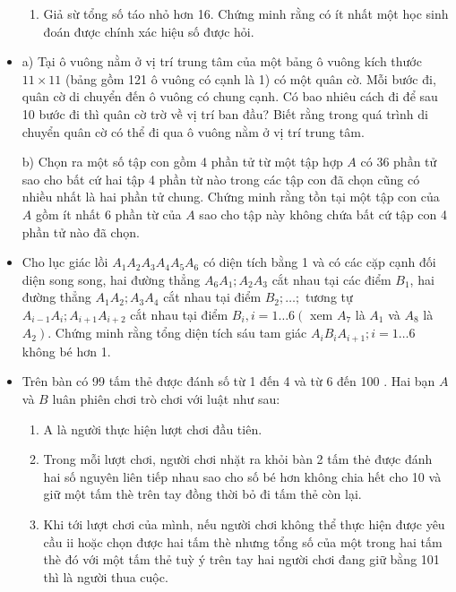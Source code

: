 \documentclass[11pt]{scrartcl}
\begin{document}
\begin{itemize}[label=, leftmargin=0em, itemsep=0.5em]
\begin{btvn}
\begin{enumerate}[label=(\alph*)]
            \item Giả sừ tổng số táo nhỏ hơn 16. Chứng minh rằng có ít nhất một học sinh đoán được chính xác hiệu số được hỏi.
        \end{enumerate}
    \end{btvn}
    \item \begin{btvn} a) Tại ô vuông nằm ở vị trí trung tâm của một bảng ô vuông kích thước $11 \times 11$ (bảng gồm 121 ô vuông có cạnh là 1) có một quân cờ. Mỗi bước đi, quân cờ di chuyển đến ô vuông có chung cạnh. Có bao nhiêu cách đi để sau 10 bước đi thì quân cờ trờ về vị trí ban đầu? Biết rằng trong quá trình di chuyển quân cờ có thể đi qua ô vuông nằm ở vị trí trung tâm.
    

        b) Chọn ra một số tập con gồm 4 phần tử từ một tập hợp $A$ có 36 phần tử sao cho bất cứ hai tập 4 phần từ nào trong các tập con đã chọn cũng có nhiều nhất là hai phần tử chung. Chứng minh rằng tồn tại một tập con của $A$ gồm ít nhất 6 phần từ của $A$ sao cho tập này không chứa bất cứ tập con 4 phần tử nào đã chọn.
    \end{btvn}
    \item \begin{btvn}
        Cho lục giác lồi $A_1 A_2 A_3 A_4 A_5 A_6$ có diện tích bằng 1 và có các cặp cạnh đối diện song song, hai đường thẳng $A_6 A_1 ; A_2 A_3$ cắt nhau tại các điểm $B_1$, hai đường thẳng $A_1 A_2 ; A_3 A_4$ cắt nhau tại điểm $B_2 ; \ldots ;$ tương tự $A_{i-1} A_i ; A_{i+1} A_{i+2}$ cắt nhau tại điểm $B_i, i=1 \ldots 6\left(\right.$ xem $A_7$ là $A_1$ và $A_8$ là $\left.A_2\right)$. Chứng minh rằng tổng diện tích sáu tam giác $A_i B_i A_{i+1} ; i=1 \ldots 6$ không bé hơn 1.
    \end{btvn}
    \item \begin{btvn}
        Trên bàn có 99 tấm thẻ được đánh số từ 1 đến 4 và từ 6 đến 100 . Hai bạn $A$ và $B$ luân phiên chơi trò chơi với luật như sau:
        \begin{enumerate}
            \item A là người thực hiện lượt chơi đầu tiên.
            \item Trong mỗi lượt chơi, người chơi nhặt ra khỏi bàn 2 tấm thė được đánh hai số nguyên liên tiếp nhau sao cho số bé hơn không chia hết cho 10 và giữ một tấm thè trên tay đồng thời bỏ đi tấm thẻ còn lại.
            \item Khi tới lượt chơi của mình, nếu người chơi không thể thực hiện được yêu cầu ii hoặc chọn được hai tấm thè nhưng tổng số của một trong hai tấm thè đó với một tấm thẻ tuỳ ý trên tay hai người chơi đang giữ bằng 101 thì là người thua cuộc.

\end{enumerate}
\end{btvn}
\end{itemize}
\end{document}
